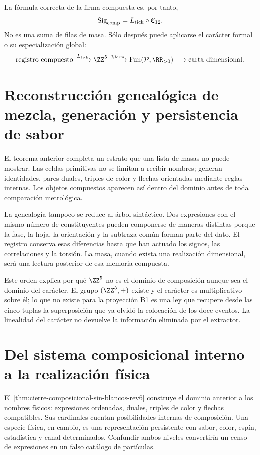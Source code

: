 La fórmula correcta de la firma compuesta es, por tanto,
\[
 \operatorname{Sig}_{\rm comp}
 =
 L_{\rm tick}\circ\mathfrak C_{12}.
\]
No es una suma de filas de masa. Sólo después puede aplicarse el carácter
formal o su especialización global:
\[
 \text{registro compuesto}
 \xrightarrow{L_{\rm tick}}\ZZ^5
 \xrightarrow{\chi_{\rm form}}\operatorname{Fun}(\mathcal P,\RR_{>0})
 \longrightarrow
 \text{carta dimensional}.
\]

\section{Reconstrucción genealógica de mezcla, generación y persistencia de sabor}
\label{sec:significado-genealogico-composicion-rev6}

El teorema anterior completa un estrato que una lista de masas no puede
mostrar. Las celdas primitivas no se limitan a recibir nombres; generan
identidades, pares duales, triples de color y flechas orientadas mediante
reglas internas. Los objetos compuestos aparecen así dentro del dominio antes
de toda comparación metrológica.

La genealogía tampoco se reduce al árbol sintáctico. Dos expresiones con el
mismo número de constituyentes pueden componerse de maneras distintas porque
la fase, la hoja, la orientación y la subtraza común forman parte del dato.
El registro conserva esas diferencias hasta que han actuado los signos, las
correlaciones y la torsión. La masa, cuando exista una realización
dimensional, será una lectura posterior de esa memoria compuesta.

Este orden explica por qué \(\ZZ^5\) no es el dominio de composición aunque
sea el dominio del carácter. El grupo \((\ZZ^5,+)\) existe y el carácter es
multiplicativo sobre él; lo que no existe para la proyección B1 es una ley
que recupere desde las cinco-tuplas la superposición que ya olvidó la
colocación de los doce eventos. La linealidad del carácter no devuelve la
información eliminada por el extractor.

\section{Del sistema composicional interno a la realización física}
\label{sec:delimitacion-composicion-especies-rev6}

El \cref{thm:cierre-composicional-sin-blancos-rev6} construye el dominio
anterior a los nombres físicos: expresiones ordenadas, duales, triples de
color y flechas compatibles. Sus cardinales cuentan posibilidades internas
de composición. Una especie física, en cambio, es una representación persistente
con sabor, color, espín, estadística y canal determinados. Confundir ambos
niveles convertiría un censo de expresiones en un falso catálogo de
partículas.

